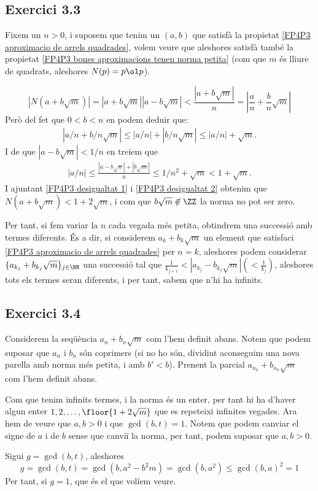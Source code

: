 \documentclass[11pt, a4paper]{article}
\begin{document}
    \subsection{Exercici 3.3}
    Fixem un $n>0$, i suposem que tenim un $(a,b)$ que satisfà la propietat \ref{FP4P3 aproximacio de arrels quadrades}, volem veure que aleshores satisfà també la propietat \ref{FP4P3 bones aproximacions tenen norma petita} (com que $m$ és lliure de quadrats, aleshores $N(p)=p\ol p$).\par
    \[
        |N(a+b\sqrt{m})|=
        |a+b\sqrt{m}||a-b\sqrt{m}|<
        \frac{|a+b\sqrt{m}|}{n}=
        \left|\frac{a}{n}+\frac{b}{n}\sqrt{m}\right|
    \]
    Però del fet que $0<b<n$ en podem deduir que:
    \begin{align}\label{FP4P3 desigualtat 1}
        |a/n+b/n\sqrt{m}|\leq|a/n|+|b/n\sqrt{m}|\leq|a/n|+\sqrt{m}.
    \end{align}
    I de que $|a-b\sqrt{m}|<1/n$ en treiem que
    \begin{align}\label{FP4P3 desigualtat 2}
        |a/n|\leq\frac{|a-b\sqrt{n}|+|b\sqrt{m}|}{n}\leq 1/n^2+\sqrt{m}<1+\sqrt{m}.
    \end{align}
    I ajuntant \ref{FP4P3 desigualtat 1} i \ref{FP4P3 desigualtat 2} obtenim que $N(a+b\sqrt{m})<1+2\sqrt{m}$, i com que $b\sqrt{m}\not\in \ZZ$ la norma no pot ser zero.\par
    Per tant, si fem variar la $n$ cada vegada més petita, obtindrem una successió amb termes diferents. És a dir, si considerem $a_k+b_k\sqrt{m}$ un element que satisfaci \ref{FP4P3 aproximacio de arrels quadrades} per $n=k$, aleshores podem considerar $\{a_{k_j}+b_{k_j}\sqrt{m}\}_{j\in\NN}$ una successió tal que $\frac{1}{k_{j+1}}<|a_{k_j}-b_{k_j}\sqrt{m}|(<\frac{1}{k_j})$, aleshores tots els termes seran diferents, i per tant, sabem que n'hi ha infinits.
    \subsection{Exercici 3.4}
    Considerem la seqüència $a_n+b_n\sqrt{m}$ com l'hem definit abans. Notem que podem suposar que $a_n$ i $b_n$ són coprimers (si no ho són, dividint aconseguim una nova parella amb norma més petita, i amb $b'<b$). Prenent la parcial $a_{n_k}+b_{n_k}\sqrt{m}$ com l'hem definit abans.\par
    Com que tenim infinits termes, i la norma és un enter, per tant hi ha d'haver algun enter $1,2,\dots,\floor{1+2\sqrt{m}}$ que es repeteixi infinites vegades. Ara hem de veure que $a,b>0$ i que $\gcd(b,t)=1$. Notem que podem canviar el signe de $a$ i de $b$ sense que canviï la norma, per tant, podem suposar que $a,b>0$.\par
    Sigui $g=\gcd(b,t)$, aleshores
    \[
        g=\gcd(b,t)=\gcd(b,a^2-b^2m)=\gcd(b,a^2)\leq\gcd(b,a)^2=1
    \]
    Per tant, si $g=1$, que és el que volíem veure.
\end{document}
